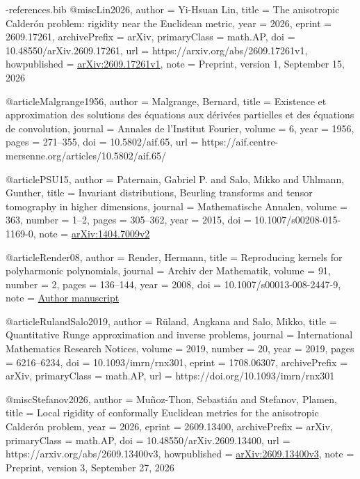 \documentclass[11pt,a4paper]{article}
\theoremstyle{definition}
\theoremstyle{remark}
\numberwithin{equation}{section}
\begin{document}
\begin{filecontents*}[overwrite]{\jobname-references.bib}
@misc{Lin2026,
  author = {Yi-Hsuan Lin},
  title = {The anisotropic {Calder{\'o}n} problem: rigidity near the {Euclidean} metric},
  year = {2026},
  eprint = {2609.17261},
  archivePrefix = {arXiv},
  primaryClass = {math.AP},
  doi = {10.48550/arXiv.2609.17261},
  url = {https://arxiv.org/abs/2609.17261v1},
  howpublished = {\href{https://arxiv.org/abs/2609.17261v1}{arXiv:2609.17261v1}},
  note = {Preprint, version 1, September 15, 2026}
}

@article{Malgrange1956,
  author = {Malgrange, Bernard},
  title = {Existence et approximation des solutions des {\'e}quations aux d{\'e}riv{\'e}es partielles et des {\'e}quations de convolution},
  journal = {Annales de l'Institut Fourier},
  volume = {6},
  year = {1956},
  pages = {271--355},
  doi = {10.5802/aif.65},
  url = {https://aif.centre-mersenne.org/articles/10.5802/aif.65/}
}

@article{PSU15,
  author = {Paternain, Gabriel P. and Salo, Mikko and Uhlmann, Gunther},
  title = {Invariant distributions, {Beurling} transforms and tensor tomography in higher dimensions},
  journal = {Mathematische Annalen},
  volume = {363}, number = {1--2}, pages = {305--362}, year = {2015},
  doi = {10.1007/s00208-015-1169-0},
  note = {\href{https://arxiv.org/abs/1404.7009v2}{arXiv:1404.7009v2}}
}

@article{Render08,
  author = {Render, Hermann},
  title = {Reproducing kernels for polyharmonic polynomials},
  journal = {Archiv der Mathematik},
  volume = {91}, number = {2}, pages = {136--144}, year = {2008},
  doi = {10.1007/s00013-008-2447-9},
  note = {\href{https://hdl.handle.net/10197/5499}{Author manuscript}}
}

@article{RulandSalo2019,
  author = {R{\"u}land, Angkana and Salo, Mikko},
  title = {Quantitative {Runge} approximation and inverse problems},
  journal = {International Mathematics Research Notices},
  volume = {2019},
  number = {20},
  year = {2019},
  pages = {6216--6234},
  doi = {10.1093/imrn/rnx301},
  eprint = {1708.06307},
  archivePrefix = {arXiv},
  primaryClass = {math.AP},
  url = {https://doi.org/10.1093/imrn/rnx301}
}

@misc{Stefanov2026,
  author = {Mu{\~n}oz-Thon, Sebasti{\'a}n and Stefanov, Plamen},
  title = {Local rigidity of conformally {Euclidean} metrics for the anisotropic {Calder{\'o}n} problem},
  year = {2026},
  eprint = {2609.13400},
  archivePrefix = {arXiv},
  primaryClass = {math.AP},
  doi = {10.48550/arXiv.2609.13400},
  url = {https://arxiv.org/abs/2609.13400v3},
  howpublished = {\href{https://arxiv.org/abs/2609.13400v3}{arXiv:2609.13400v3}},
  note = {Preprint, version 3, September 27, 2026}
}


\end{filecontents*}
\end{document}
